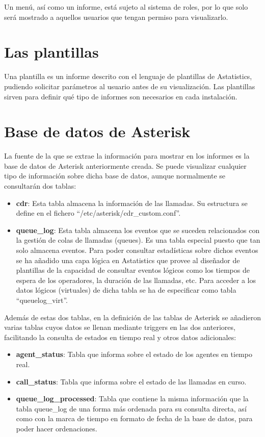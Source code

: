 \documentclass[spanish,12pt]{book}
\begin{document}
Un menú, así como un informe, está sujeto al sistema de roles, por lo que solo será mostrado a aquellos usuarios que tengan permiso para visualizarlo.

\section{Las plantillas}
Una plantilla es un informe descrito con el lenguaje de plantillas de Astatistics, pudiendo solicitar parámetros al usuario antes de su visualización. Las plantillas sirven para definir qué tipo de informes son necesarios en cada instalación.

\section{Base de datos de Asterisk}
La fuente de la que se extrae la información para mostrar en los informes es la base de datos de Asterisk anteriormente creada. Se puede visualizar cualquier tipo de información sobre dicha base de datos, aunque normalmente se consultarán dos tablas:

\begin{itemize}
\item {\bf cdr}: Esta tabla almacena la información de las llamadas. Su estructura se define en el fichero ``/etc/asterisk/cdr\_custom.conf''.
\item {\bf queue\_log}: Esta tabla almacena los eventos que se suceden relacionados con la gestión de colas de llamadas (queues). Es una tabla especial puesto que tan solo almacena eventos. Para poder consultar estadísticas sobre dichos eventos se ha añadido una capa lógica en Astatistics que provee al diseñador de plantillas de la capacidad de consultar eventos lógicos como los tiempos de espera de los operadores, la duración de las llamadas, etc. Para acceder a los datos lógicos (virtuales) de dicha tabla se ha de especificar como tabla ``queuelog\_virt''.\end{itemize}

Además de estas dos tablas, en la definición de las tablas de Asterisk se añadieron varias tablas cuyos datos se llenan mediante triggers en las dos anteriores, facilitando la consulta de estados en tiempo real y otros datos adicionales:

\begin{itemize}
\item {\bf agent\_status}: Tabla que informa sobre el estado de los agentes en tiempo real.
\item {\bf call\_status}: Tabla que informa sobre el estado de las llamadas en curso.
\item {\bf queue\_log\_processed}: Tabla que contiene la misma información que la tabla queue\_log de una forma más ordenada para su consulta directa, así como con la marca de tiempo en formato de fecha de la base de datos, para poder hacer ordenaciones.
\end{itemize}
\end{document}
